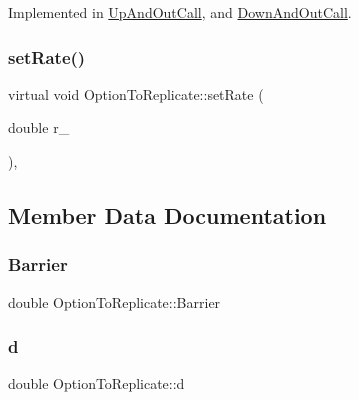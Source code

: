 Implemented in \hyperlink{classUpAndOutCall_a6e3ed611443089f59d148e4f30428b0b}{Up\+And\+Out\+Call}, and \hyperlink{classDownAndOutCall_a6ccfc2e5d77a48558087d4b9df914377}{Down\+And\+Out\+Call}.

\hypertarget{classOptionToReplicate_ac93d01199a0c2dfcfedb6185d6f0de2f}{}\label{classOptionToReplicate_ac93d01199a0c2dfcfedb6185d6f0de2f} 
\subsubsection{\texorpdfstring{set\+Rate()}{setRate()}}
{\footnotesize\ttfamily virtual void Option\+To\+Replicate\+::set\+Rate (\begin{DoxyParamCaption}\item[{double}]{r\+\_\+ }\end{DoxyParamCaption})\hspace{0.3cm}{\ttfamily [inline]}, {\ttfamily [virtual]}}



\subsection{Member Data Documentation}
\hypertarget{classOptionToReplicate_a7cd35379de855ad6e53008fbf7e9dda0}{}\label{classOptionToReplicate_a7cd35379de855ad6e53008fbf7e9dda0} 
\subsubsection{\texorpdfstring{Barrier}{Barrier}}
{\footnotesize\ttfamily double Option\+To\+Replicate\+::\+Barrier\hspace{0.3cm}{\ttfamily [protected]}}

\hypertarget{classOptionToReplicate_aa088a512c974dc622ca1bbca61ec5e34}{}\label{classOptionToReplicate_aa088a512c974dc622ca1bbca61ec5e34} 
\subsubsection{\texorpdfstring{d}{d}}
{\footnotesize\ttfamily double Option\+To\+Replicate\+::d\hspace{0.3cm}{\ttfamily [protected]}}

